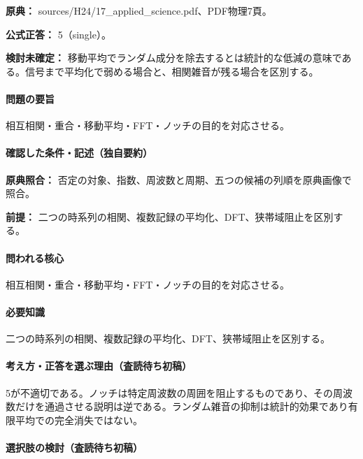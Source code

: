 \noindent\textbf{原典：} sources/H24/17\_applied\_science.pdf、PDF物理7頁。

\textbf{公式正答：} 5（single）。

\par\textbf{検討未確定：} 移動平均でランダム成分を除去するとは統計的な低減の意味である。信号まで平均化で弱める場合と、相関雑音が残る場合を区別する。

\paragraph{問題の要旨} 相互相関・重合・移動平均・FFT・ノッチの目的を対応させる。

\paragraph{確認した条件・記述（独自要約）}\mbox{}\par

\noindent\textbf{原典照合：} 否定の対象、指数、周波数と周期、五つの候補の列順を原典画像で照合。\par

\noindent\textbf{前提：} 二つの時系列の相関、複数記録の平均化、DFT、狭帯域阻止を区別する。\par

\paragraph{問われる核心} 相互相関・重合・移動平均・FFT・ノッチの目的を対応させる。

\paragraph{必要知識} 二つの時系列の相関、複数記録の平均化、DFT、狭帯域阻止を区別する。

\paragraph{考え方・正答を選ぶ理由（査読待ち初稿）} 5が不適切である。ノッチは特定周波数の周囲を阻止するものであり、その周波数だけを通過させる説明は逆である。ランダム雑音の抑制は統計的効果であり有限平均での完全消失ではない。

\paragraph{選択肢の検討（査読待ち初稿）}\mbox{}\par

